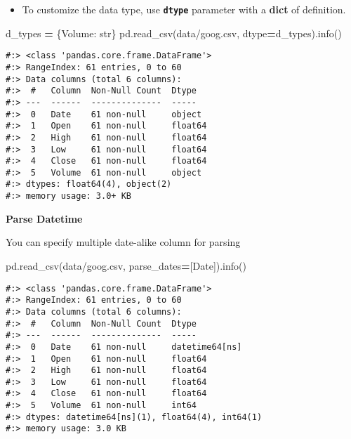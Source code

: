\documentclass[
]{book}
\newenvironment{Shaded}{\begin{snugshade}}{\end{snugshade}}
\newcommand{\BuiltInTok}[1]{#1}
\newcommand{\NormalTok}[1]{#1}
\newcommand{\OperatorTok}[1]{\textcolor[rgb]{0.43,0.43,0.43}{\textbf{#1}}}
\newcommand{\StringTok}[1]{\textcolor[rgb]{0.5,0.5,0.5}{#1}}
\providecommand{\tightlist}{%
  \setlength{\itemsep}{0pt}\setlength{\parskip}{0pt}}
\begin{document}
\begin{itemize}
\tightlist
\item
  To customize the data type, use \textbf{\texttt{dtype}} parameter with a \textbf{dict} of definition.
\end{itemize}

\begin{Shaded}
\begin{Highlighting}[]
\NormalTok{d\_types }\OperatorTok{=}\NormalTok{ \{}\StringTok{\textquotesingle{}Volume\textquotesingle{}}\NormalTok{: }\BuiltInTok{str}\NormalTok{\}}
\NormalTok{pd.read\_csv(}\StringTok{\textquotesingle{}data/goog.csv\textquotesingle{}}\NormalTok{, dtype}\OperatorTok{=}\NormalTok{d\_types).info()}
\end{Highlighting}
\end{Shaded}

\begin{verbatim}
#:> <class 'pandas.core.frame.DataFrame'>
#:> RangeIndex: 61 entries, 0 to 60
#:> Data columns (total 6 columns):
#:>  #   Column  Non-Null Count  Dtype  
#:> ---  ------  --------------  -----  
#:>  0   Date    61 non-null     object 
#:>  1   Open    61 non-null     float64
#:>  2   High    61 non-null     float64
#:>  3   Low     61 non-null     float64
#:>  4   Close   61 non-null     float64
#:>  5   Volume  61 non-null     object 
#:> dtypes: float64(4), object(2)
#:> memory usage: 3.0+ KB
\end{verbatim}

\textbf{Parse Datetime}

You can specify multiple date-alike column for parsing

\begin{Shaded}
\begin{Highlighting}[]
\NormalTok{pd.read\_csv(}\StringTok{\textquotesingle{}data/goog.csv\textquotesingle{}}\NormalTok{, parse\_dates}\OperatorTok{=}\NormalTok{[}\StringTok{\textquotesingle{}Date\textquotesingle{}}\NormalTok{]).info()}
\end{Highlighting}
\end{Shaded}

\begin{verbatim}
#:> <class 'pandas.core.frame.DataFrame'>
#:> RangeIndex: 61 entries, 0 to 60
#:> Data columns (total 6 columns):
#:>  #   Column  Non-Null Count  Dtype         
#:> ---  ------  --------------  -----         
#:>  0   Date    61 non-null     datetime64[ns]
#:>  1   Open    61 non-null     float64       
#:>  2   High    61 non-null     float64       
#:>  3   Low     61 non-null     float64       
#:>  4   Close   61 non-null     float64       
#:>  5   Volume  61 non-null     int64         
#:> dtypes: datetime64[ns](1), float64(4), int64(1)
#:> memory usage: 3.0 KB
\end{verbatim}
\end{document}
